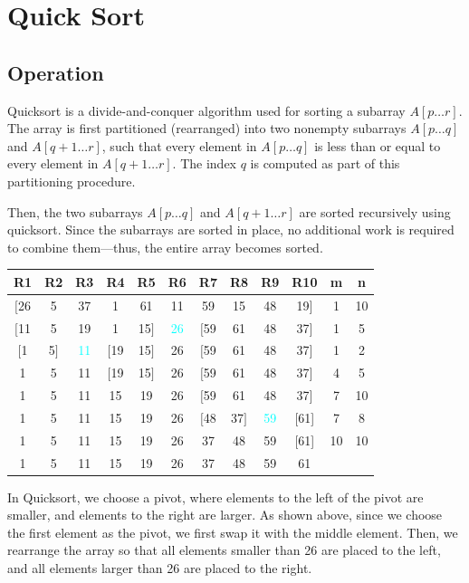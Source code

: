 \section{Quick Sort}
\subsection{Operation}
Quicksort is a divide-and-conquer algorithm used for sorting a subarray \(A[p \ldots r]\). The array is first partitioned (rearranged) into two nonempty subarrays \(A[p \ldots q]\) and \(A[q + 1 \ldots r]\), such that every element in \(A[p \ldots q]\) is less than or equal to every element in \(A[q + 1 \ldots r]\). The index \(q\) is computed as part of this partitioning procedure.

Then, the two subarrays \(A[p \ldots q]\) and \(A[q + 1 \ldots r]\) are sorted recursively using quicksort. Since the subarrays are sorted in place, no additional work is required to combine them—thus, the entire array becomes sorted.

\begin{table}[H]
  \centering
  \begin{tabular}{c|c|c|c|c|c|c|c|c|c|c|c}
      \toprule
      R1 & R2 & R3 & R4 & R5 & R6 & R7 & R8 & R9 & R10 & m & n  \\
    \midrule
      \([\)26 & 5 & 37 & 1 & 61 & 11 & 59 & 15 & 48 & 19\(]\)  & 1 & 10  \\
      \([\)11 & 5 & 19 & 1 & 15\(]\) & \textcolor{cyan}{26} & \([\)59 & 61 & 48 & 37\(]\) & 1 & 5  \\
      \([\)1 & 5\(]\) & \textcolor{cyan}{11} & \([\)19 & 15\(]\) & 26 & \([\)59 & 61 & 48 & 37\(]\) & 1 & 2  \\
      1 & 5 & 11 & \([\)19 & 15\(]\) & 26 & \([\)59 & 61 & 48 & 37\(]\) & 4 & 5  \\
      1 & 5 & 11 & 15 & 19 & 26 & \([\)59 & 61 & 48 & 37\(]\) & 7 & 10  \\
      1 & 5 & 11 & 15 & 19 & 26 & \([\)48 & 37\(]\) & \textcolor{cyan}{59} & [61] & 7 & 8  \\
      1 & 5 & 11 & 15 & 19 & 26 & 37 & 48 & 59 & [61] & 10 & 10  \\
      1 & 5 & 11 & 15 & 19 & 26 & 37 & 48 & 59 & 61 &  &   \\
      \bottomrule
  \end{tabular}
\end{table}

In Quicksort, we choose a pivot, where elements to the left of the pivot are smaller, and elements to the right are larger. As shown above, since we choose the first element as the pivot, we first swap it with the middle element. Then, we rearrange the array so that all elements smaller than 26 are placed to the left, and all elements larger than 26 are placed to the right.

